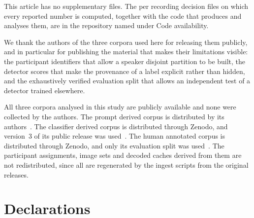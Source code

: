 \documentclass[pdflatex,sn-mathphys-num]{sn-jnl}
\begin{document}
\backmatter


This article has no supplementary files. The per recording decision files on which every
reported number is computed, together with the code that produces and analyses them, are
in the repository named under Code availability.


We thank the authors of the three corpora used here for releasing them publicly, and in
particular for publishing the material that makes their limitations visible: the
participant identifiers that allow a speaker disjoint partition to be built, the detector
scores that make the provenance of a label explicit rather than hidden, and the
exhaustively verified evaluation split that allows an independent test of a detector
trained elsewhere.


All three corpora analysed in this study are publicly available and none were collected
by the authors. The prompt derived corpus is distributed by its authors~\cite{coswara2020}.
The classifier derived corpus is distributed through Zenodo, and version~3 of its public
release was used~\cite{coughvid2021}. The human annotated corpus is distributed through
Zenodo, and only its evaluation split was used~\cite{fsd50k2022}. The participant
assignments, image sets and decoded caches derived from them are not redistributed, since
all are regenerated by the ingest scripts from the original releases.

\section*{Declarations}
\end{document}
